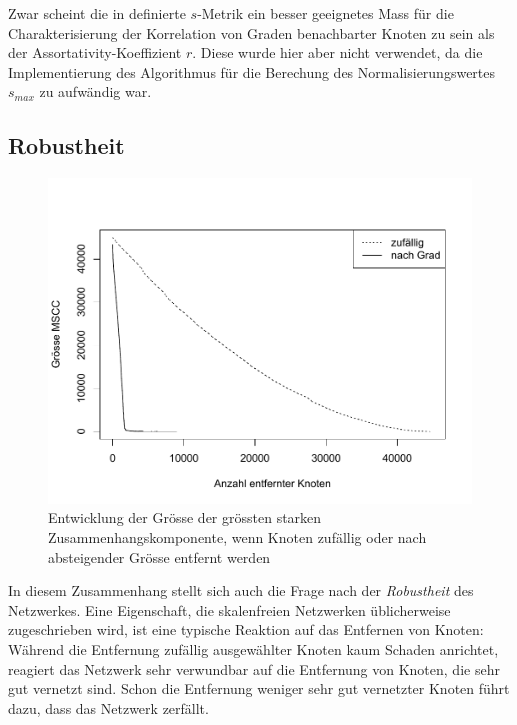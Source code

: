 Zwar scheint die in \cite{Li2005} definierte $s$-Metrik ein besser
geeignetes Mass f\"ur die Charakterisierung der Korrelation von Graden
benachbarter Knoten zu sein als der Assortativity-Koeffizient
$r$. Diese wurde hier aber nicht verwendet, da die Implementierung des
Algorithmus f\"ur die Berechung des Normalisierungswertes $s_{max}$ zu
aufw\"andig war.

\subsection{Robustheit}
\label{sec:robustheit}

\begin{figure}[ht!]
  \centering
  \includegraphics[scale=0.45]{images/without.pdf}
  \caption{Entwicklung der Gr\"osse der gr\"ossten starken
    Zusammenhangskomponente, wenn Knoten zuf\"allig oder nach absteigender
    Gr\"osse entfernt werden}
  \label{fig:without}
\end{figure}

In diesem Zusammenhang stellt sich auch die Frage nach der
\emph{Robustheit} des Netzwerkes.  Eine Eigenschaft, die skalenfreien
Netzwerken \"ublicherweise zugeschrieben wird\cite{Albert2000}, ist
eine typische Reaktion auf das Entfernen von Knoten: W\"ahrend die
Entfernung zuf\"allig ausgew\"ahlter Knoten kaum Schaden anrichtet,
reagiert das Netzwerk sehr verwundbar auf die Entfernung von Knoten,
die sehr gut vernetzt sind. Schon die Entfernung weniger sehr gut
vernetzter Knoten f\"uhrt dazu, dass das Netzwerk zerf\"allt.

